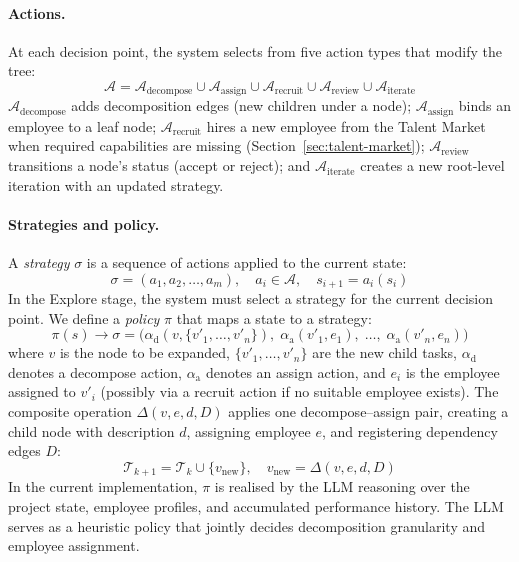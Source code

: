 \documentclass[11pt,a4paper]{article}
\begin{document}
\paragraph{Actions.}
At each decision point, the system selects from five action types that modify the tree:
\begin{equation}
\mathcal{A} = \mathcal{A}_{\text{decompose}} \cup \mathcal{A}_{\text{assign}} \cup \mathcal{A}_{\text{recruit}} \cup \mathcal{A}_{\text{review}} \cup \mathcal{A}_{\text{iterate}}
\end{equation}
$\mathcal{A}_{\text{decompose}}$ adds decomposition edges (new children under a node); $\mathcal{A}_{\text{assign}}$ binds an employee to a leaf node; $\mathcal{A}_{\text{recruit}}$ hires a new employee from the Talent Market when required capabilities are missing (Section~\ref{sec:talent-market}); $\mathcal{A}_{\text{review}}$ transitions a node’s status (accept or reject); and $\mathcal{A}_{\text{iterate}}$ creates a new root-level iteration with an updated strategy.

\paragraph{Strategies and policy.}
A \emph{strategy} $\sigma$ is a sequence of actions applied to the current state:
\begin{equation}
\sigma = (a_1, a_2, \ldots, a_m), \quad a_i \in \mathcal{A}, \quad s_{i+1} = a_i(s_i)
\end{equation}
In the Explore stage, the system must select a strategy for the current decision point.  We define a \emph{policy} $\pi$ that maps a state to a strategy:
\begin{equation}
\pi(s) \to \sigma = \bigl(\alpha_{\text{d}}(v, \{v'_1, \ldots, v'_n\}),\; \alpha_{\text{a}}(v'_1, e_1),\; \ldots,\; \alpha_{\text{a}}(v'_n, e_n)\bigr)
\end{equation}
where $v$ is the node to be expanded, $\{v'_1, \ldots, v'_n\}$ are the new child tasks, $\alpha_{\text{d}}$ denotes a decompose action, $\alpha_{\text{a}}$ denotes an assign action, and $e_i$ is the employee assigned to $v'_i$ (possibly via a recruit action if no suitable employee exists).  The composite operation $\Delta(v, e, d, D)$ applies one decompose--assign pair, creating a child node with description $d$, assigning employee $e$, and registering dependency edges $D$:
\begin{equation}
\mathcal{T}_{k+1} = \mathcal{T}_k \cup \{v_{\text{new}}\}, \quad v_{\text{new}} = \Delta(v, e, d, D)
\end{equation}
In the current implementation, $\pi$ is realised by the LLM reasoning over the project state, employee profiles, and accumulated performance history.  The LLM serves as a heuristic policy that jointly decides decomposition granularity and employee assignment.
\end{document}

